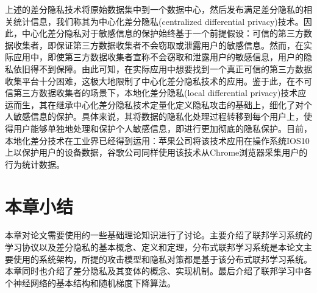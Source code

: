 上述的差分隐私技术将原始数据集中到一个数据中心，然后发布满足差分隐私的相关统计信息，我们称其为中心化差分隐私(centralized differential privacy)技术。因此，中心化差分隐私对于敏感信息的保护始终基于一个前提假设：可信的第三方数据收集者，即保证第三方数据收集者不会窃取或泄露用户的敏感信息。然而，在实际应用中，即使第三方数据收集者宣称不会窃取和泄露用户的敏感信息，用户的隐私依旧得不到保障。由此可知，在实际应用中想要找到一个真正可信的第三方数据收集平台十分困难，这极大地限制了中心化差分隐私技术的应用。鉴于此，在不可信第三方数据收集者的场景下，本地化差分隐私(local differential privacy)技术应运而生，其在继承中心化差分隐私技术定量化定义隐私攻击的基础上，细化了对个人敏感信息的保护。具体来说，其将数据的隐私化处理过程转移到每个用户上，使得用户能够单独地处理和保护个人敏感信息，即进行更加彻底的隐私保护。目前，本地化差分技术在工业界已经得到运用：苹果公司将该技术应用在操作系统IOS10上以保护用户的设备数据，谷歌公司同样使用该技术从Chrome浏览器采集用户的行为统计数据。


\section{本章小结}
本章对论文需要使用的一些基础理论知识进行了讨论。主要介绍了联邦学习系统的学习协议以及差分隐私的基本概念、定义和定理，分布式联邦学习系统是本论文主要使用的系统架构，所提的攻击模型和隐私对策都是基于该分布式联邦学习系统。本章同时也介绍了差分隐私及其变体的概念、实现机制。最后介绍了联邦学习中各个神经网络的基本结构和随机梯度下降算法。
